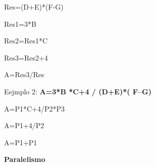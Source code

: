 \begin{center}
Res=(D+E)*(F-G)
\end{center}

\begin{center}
Res1=3*B
\end{center}

\begin{center}
Res2=Res1*C
\end{center}

\begin{center}
Res3=Res2+4
\end{center}

\begin{center}
A=Res3/Res
\end{center}
\vspace{1cm}

\begin{center}
Eejmplo 2: \textbf{A=3*B *C+4 / (D+E)*( F--G)}
\end{center}

A=P1*C+4/P2*P3

A=P1+4/P2

A=P1+P1
\vspace{2cm}

\begin{center}
\textbf{Paralelismo}
\end{center}

